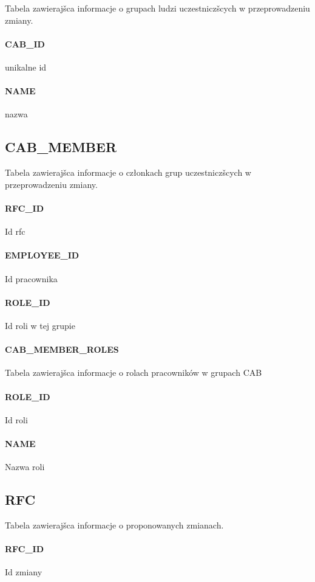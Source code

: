 \documentclass[a4paper, oneside, 11pt]{report}
\begin{document}
Tabela zawierajšca informacje o grupach ludzi uczestniczšcych w przeprowadzeniu zmiany.

\paragraph{CAB\_ID} unikalne id
\paragraph{NAME} nazwa

\subsection{CAB\_MEMBER} Tabela zawierajšca informacje o członkach grup uczestniczšcych w przeprowadzeniu zmiany.

\paragraph{RFC\_ID} Id rfc
\paragraph{EMPLOYEE\_ID} Id pracownika
\paragraph{ROLE\_ID} Id roli w tej grupie


\paragraph{CAB\_MEMBER\_ROLES} Tabela zawierajšca informacje o rolach pracowników w grupach CAB

\paragraph{ROLE\_ID} Id roli
\paragraph{NAME} Nazwa roli

\subsection{RFC} Tabela zawierajšca informacje o proponowanych zmianach.

\paragraph{RFC\_ID} Id zmiany
\end{document}
